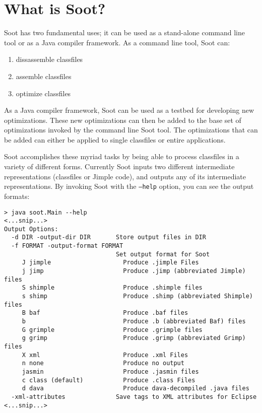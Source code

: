 \documentclass{article}
\begin{document}
\section{What is Soot?}

Soot has two fundamental uses; it can be used as a stand-alone command
line tool or as a Java compiler framework.  As a command line tool,
Soot can:
\begin{enumerate}
\item dissassemble classfiles
\item assemble classfiles
\item optimize classfiles
\end{enumerate}

As a Java compiler framework, Soot can be used as a testbed for
developing new optimizations.  These new optimizations can then be
added to the base set of optimizations invoked by the command line
Soot tool.  The optimizations that can be added can either be applied
to single classfiles or entire applications.

Soot accomplishes these myriad tasks by being able to process
classfiles in a variety of different forms.  Currently Soot inputs two
different intermediate representations (classfiles or Jimple code),
and outputs any of its intermediate representations.  By invoking Soot with
the \texttt{--help} option,
you can see the output formats:

\begin{verbatim}
> java soot.Main --help
<...snip...>
Output Options:
  -d DIR -output-dir DIR       Store output files in DIR 
  -f FORMAT -output-format FORMAT
                               Set output format for Soot 
     J jimple                    Produce .jimple Files 
     j jimp                      Produce .jimp (abbreviated Jimple) files 
     S shimple                   Produce .shimple files 
     s shimp                     Produce .shimp (abbreviated Shimple) files 
     B baf                       Produce .baf files 
     b                           Produce .b (abbreviated Baf) files 
     G grimple                   Produce .grimple files 
     g grimp                     Produce .grimp (abbreviated Grimp) files 
     X xml                       Produce .xml Files 
     n none                      Produce no output 
     jasmin                      Produce .jasmin files 
     c class (default)           Produce .class Files 
     d dava                      Produce dava-decompiled .java files 
  -xml-attributes              Save tags to XML attributes for Eclipse 
<...snip...>
\end{verbatim}
\end{document}
